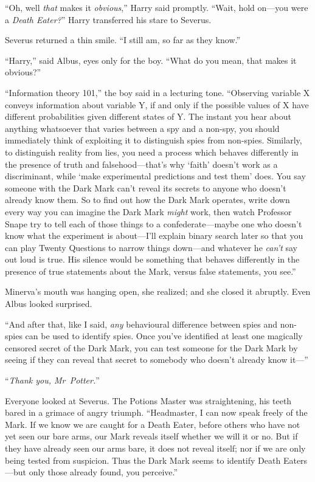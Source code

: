 “Oh, well \emph{that} makes it \emph{obvious},” Harry said promptly. “Wait, hold on—you were a \emph{Death Eater?}” Harry transferred his stare to Severus.

Severus returned a thin smile. “I still am, so far as they know.”

“Harry,” said Albus, eyes only for the boy. “What do you mean, that makes it obvious?”

“Information theory 101,” the boy said in a lecturing tone. “Observing variable X conveys information about variable Y, if and only if the possible values of X have different probabilities given different states of Y\@. The instant you hear about anything whatsoever that varies between a spy and a non-spy, you should immediately think of exploiting it to distinguish spies from non-spies. Similarly, to distinguish reality from lies, you need a process which behaves differently in the presence of truth and falsehood—that’s why ‘faith’ doesn’t work as a discriminant, while ‘make experimental predictions and test them’ does. You say someone with the Dark Mark can’t reveal its secrets to anyone who doesn’t already know them. So to find out how the Dark Mark operates, write down every way you can imagine the Dark Mark \emph{might} work, then watch Professor Snape try to tell each of those things to a confederate—maybe one who doesn’t know what the experiment is about—I’ll explain binary search later so that you can play Twenty Questions to narrow things down—and whatever he \emph{can’t} say out loud is true. His silence would be something that behaves differently in the presence of true statements about the Mark, versus false statements, you see.”

Minerva’s mouth was hanging open, she realized; and she closed it abruptly. Even Albus looked surprised.

“And after that, like I said, \emph{any} behavioural difference between spies and non-spies can be used to identify spies. Once you’ve identified at least one magically censored secret of the Dark Mark, you can test someone for the Dark Mark by seeing if they can reveal that secret to somebody who doesn’t already know it—”

“\emph{Thank you, Mr~Potter.}”

Everyone looked at Severus. The Potions Master was straightening, his teeth bared in a grimace of angry triumph. “Headmaster, I can now speak freely of the Mark. If we know we are caught for a Death Eater, before others who have not yet seen our bare arms, our Mark reveals itself whether we will it or no. But if they have already seen our arms bare, it does not reveal itself; nor if we are only being tested from suspicion. Thus the Dark Mark seems to identify Death Eaters—but only those already found, you perceive.”

